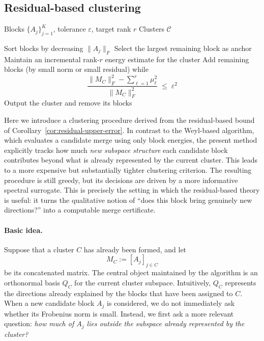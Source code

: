 \documentclass[10pt]{article} %
\begin{document}
\subsection{Residual-based clustering}
\label{appendix:algo2}

\begin{algorithm}[t]
\caption{Residual-based clustering}
\label{alg:residual-clustering}
\begin{algorithmic}[1]
\REQUIRE Blocks $\{A_j\}_{j=1}^K$, tolerance $\varepsilon$, target rank $r$
\ENSURE Clusters $\mathcal{C}$

\STATE Sort blocks by decreasing $\|A_j\|_F$
  \STATE Select the largest remaining block as anchor
  \STATE Maintain an incremental rank-$r$ energy estimate for the cluster
  \STATE Add remaining blocks (by small norm or small residual) while
  \[
    \frac{\|M_C\|_F^2 - \sum_{\ell=1}^r \mu_\ell^2}{\|M_C\|_F^2}
    \;\le\; \varepsilon^2
  \]
  \STATE Output the cluster and remove its blocks
\ENDWHILE
\end{algorithmic}
\end{algorithm}

Here we introduce a clustering procedure derived from the residual-based bound
of Corollary~\ref{cor:residual-upper-error}. In contrast to the Weyl-based
algorithm, which evaluates a candidate merge using only block energies, the
present method explicitly tracks how much \emph{new subspace structure} each
candidate block contributes beyond what is already represented by the current
cluster. This leads to a more expensive but substantially tighter clustering
criterion. The resulting procedure is still greedy, but its decisions are
driven by a more informative spectral surrogate. This is precisely the setting
in which the residual-based theory is useful: it turns the qualitative notion
of ``does this block bring genuinely new directions?'' into a computable merge
certificate.

\paragraph{Basic idea.}
Suppose that a cluster $C$ has already been formed, and let
\[
  M_C := [A_j]_{j\in C}
\]
be its concatenated matrix. The central object maintained by the algorithm is
an orthonormal basis $Q_C$ for the current cluster subspace. Intuitively,
$Q_C$ represents the directions already explained by the blocks that have
been assigned to $C$. When a new candidate block $A_j$ is considered, we do
not immediately ask whether its Frobenius norm is small. Instead, we first ask
a more relevant question: \emph{how much of $A_j$ lies outside the subspace
already represented by the cluster?}
\end{document}
